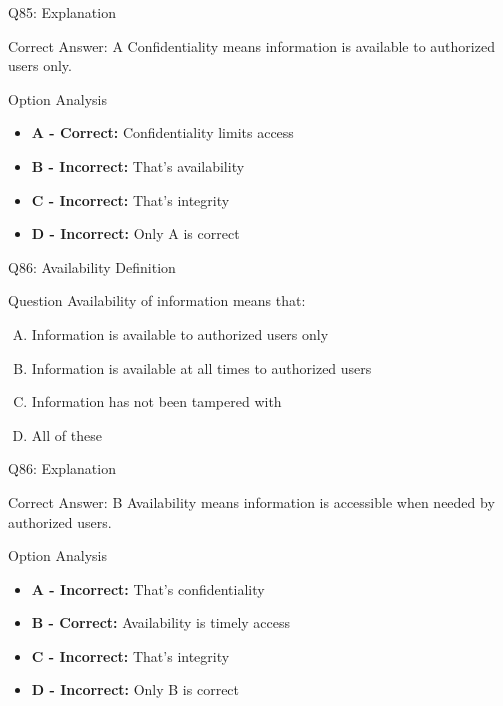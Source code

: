 \documentclass{beamer}
\begin{document}
	\begin{frame}{Q85: Explanation}
		\begin{block}{Correct Answer: A}
			Confidentiality means information is available to authorized users only.
		\end{block}
		\begin{block}{Option Analysis}
			\begin{itemize}
				\item \textbf{A - Correct:} Confidentiality limits access
				\item \textbf{B - Incorrect:} That's availability
				\item \textbf{C - Incorrect:} That's integrity
				\item \textbf{D - Incorrect:} Only A is correct
			\end{itemize}
		\end{block}
	\end{frame}
	
	\begin{frame}{Q86: Availability Definition}
		\begin{block}{Question}
			Availability of information means that:
		\end{block}
		\begin{enumerate}[(A)]
			\item Information is available to authorized users only
			\item Information is available at all times to authorized users
			\item Information has not been tampered with
			\item All of these
		\end{enumerate}
	\end{frame}
	
	\begin{frame}{Q86: Explanation}
		\begin{block}{Correct Answer: B}
			Availability means information is accessible when needed by authorized users.
		\end{block}
		\begin{block}{Option Analysis}
			\begin{itemize}
				\item \textbf{A - Incorrect:} That's confidentiality
				\item \textbf{B - Correct:} Availability is timely access
				\item \textbf{C - Incorrect:} That's integrity
				\item \textbf{D - Incorrect:} Only B is correct
			\end{itemize}
		\end{block}
	\end{frame}
	
\end{document}
